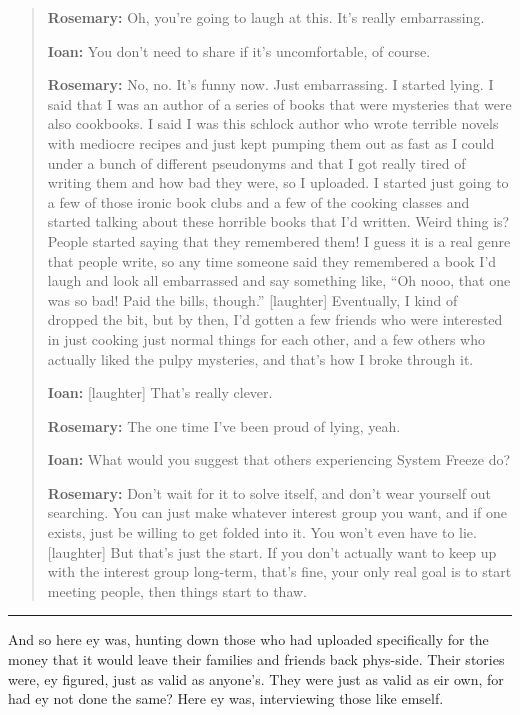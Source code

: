 \begin{quote}
\textbf{Rosemary:} Oh, you're going to laugh at this. It's really embarrassing.

\textbf{Ioan:} You don't need to share if it's uncomfortable, of course.

\textbf{Rosemary:} No, no. It's funny now. Just embarrassing. I started lying. I said that I was an author of a series of books that were mysteries that were also cookbooks. I said I was this schlock author who wrote terrible novels with mediocre recipes and just kept pumping them out as fast as I could under a bunch of different pseudonyms and that I got really tired of writing them and how bad they were, so I uploaded. I started just going to a few of those ironic book clubs and a few of the cooking classes and started talking about these horrible books that I'd written. Weird thing is? People started saying that they remembered them! I guess it is a real genre that people write, so any time someone said they remembered a book I'd laugh and look all embarrassed and say something like, ``Oh nooo, that one was so bad! Paid the bills, though.'' {[}laughter{]} Eventually, I kind of dropped the bit, but by then, I'd gotten a few friends who were interested in just cooking just normal things for each other, and a few others who actually liked the pulpy mysteries, and that's how I broke through it.

\textbf{Ioan:} {[}laughter{]} That's really clever.

\textbf{Rosemary:} The one time I've been proud of lying, yeah.

\textbf{Ioan:} What would you suggest that others experiencing System Freeze do?

\textbf{Rosemary:} Don't wait for it to solve itself, and don't wear yourself out searching. You can just make whatever interest group you want, and if one exists, just be willing to get folded into it. You won't even have to lie. {[}laughter{]} But that's just the start. If you don't actually want to keep up with the interest group long-term, that's fine, your only real goal is to start meeting people, then things start to thaw.
\end{quote}

\begin{center}\rule{0.5\linewidth}{0.5pt}\end{center}

And so here ey was, hunting down those who had uploaded specifically for the money that it would leave their families and friends back phys-side. Their stories were, ey figured, just as valid as anyone's. They were just as valid as eir own, for had ey not done the same? Here ey was, interviewing those like emself.

